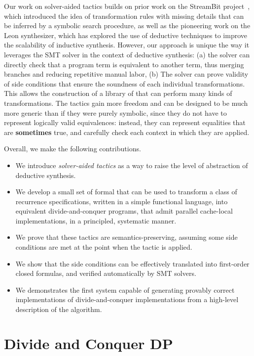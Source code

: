 Our work on solver-aided tactics builds on prior work on the StreamBit project~\cite{PLDI05/Solar-Lezama}, which introduced the idea of transformation rules with missing details that can be inferred by a symbolic search procedure, as well as the pioneering work on the Leon synthesizer, which has explored the use of deductive techniques to improve the scalability of inductive synthesis. However, our approach is unique the way it leverages the SMT solver in the context of deductive synthesis: (a) the solver can directly check that a program term is equivalent to another term, thus merging branches and reducing repetitive manual labor, (b) The solver can prove validity of side conditions that ensure the soundness of each individual transformations. This allows the construction of a library of  that can perform many kinds of transformations. The tactics gain more freedom and can be designed to be much more generic than if they were purely symbolic, since they do not have to represent logically valid equivalences: instead, they can represent equalities that are {\bf sometimes} true, and carefully check each context in which they are applied. 

Overall, we make the following contributions.
\begin{itemize}
\item We introduce \emph{solver-aided tactics} as a way to raise the level of abstraction of deductive synthesis.
\item We develop a small set of formal  that can be used to transform a class of recurrence
  specifications, written in a simple functional language, 
  into equivalent divide-and-conquer programs, that admit parallel cache-local
  implementations, in a principled, systematic manner.
\item We prove that these tactics are semantics-preserving, assuming some side conditions are met
  at the point when the tactic is applied.
  \item We show that the side conditions can be effectively translated into first-order closed
  formulas, and verified automatically by SMT solvers.
\item We demonstrates the first system capable of generating provably correct implementations of divide-and-conquer implementations from a high-level description of the algorithm. 
\end{itemize} 

\section{Divide and Conquer DP}
\label{divide}

